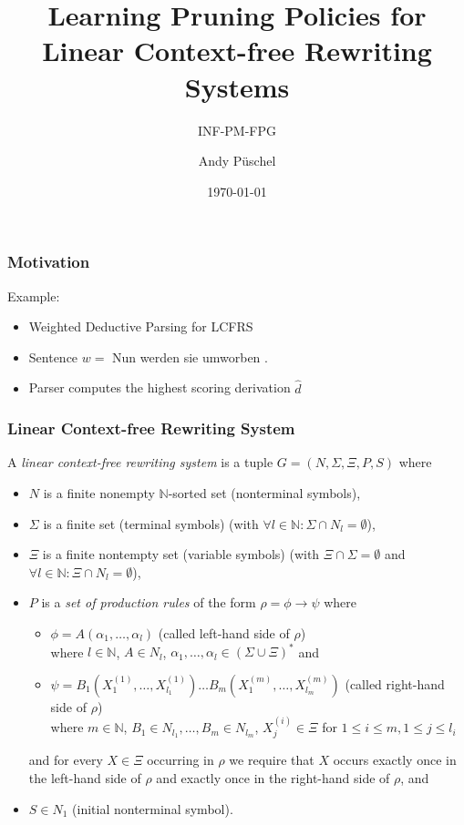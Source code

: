 \documentclass[ddcfooter, noheader, nototalpages, nosectionnum, svgnames]{tudbeamer}
\title{Learning Pruning Policies for Linear Context-free Rewriting Systems}
\subtitle{INF-PM-FPG}
\author{Andy Püschel}
\date{\today}
\begin{document}
\maketitle

\begin{frame}
	\frametitle{Motivation}
	Example:
	\begin{itemize}
		\item Weighted Deductive Parsing for LCFRS
		\item Sentence
			$w =$ Nun werden sie umworben .
		\item Parser computes the highest scoring derivation $\hat{d}$
	\end{itemize}
\end{frame}

\begin{frame}
	\frametitle{Linear Context-free Rewriting System}
	\begin{definition}
		A \emph{linear context-free rewriting system} is a tuple
		$G =(N, \Sigma, \Xi, P, S)$ where
		\begin{itemize}
			\item $N$ is a finite nonempty $\mathbb{N}$-sorted set (nonterminal symbols),
			\item $\Sigma$ is a finite set (terminal symbols)
				(with $\forall l \in \mathbb{N}: \Sigma \cap N_l = \emptyset$),
			\item $\Xi$ is a finite nontempty set (variable symbols)
				(with $\Xi \cap \Sigma = \emptyset$ and
				$\forall l \in \mathbb{N}: \Xi \cap N_l = \emptyset$),
			\item $P$ is a \emph{set of production rules}
				of the form $\rho = \phi \to \psi$ where
				\begin{itemize}
					\item $\phi = A(\alpha_1, \ldots, \alpha_l)$
						(called left-hand side of $\rho$)\\
						where $l \in \mathbb{N}$, $A \in N_l$,
						$\alpha_1, \ldots, \alpha_l \in (\Sigma \cup \Xi)^*$ and
					\item $\psi = B_1(X^{(1)}_1, \ldots, X^{(1)}_{l_1})
						\ldots B_m(X^{(m)}_1, \ldots, X^{(m)}_{l_m})$
						(called right-hand side of $\rho$)\\
						where $m \in \mathbb{N}$,
						$B_1 \in N_{l_1}, \ldots, B_m \in N_{l_m}$,
						$X^{(i)}_{j} \in \Xi$ for $1 \leq i \leq m, 1 \leq j \leq l_i$
				\end{itemize}
				and for every $X \in \Xi$ occurring in $\rho$ we require that $X$ occurs
				exactly once in the left-hand side of $\rho$ and
				exactly once in the right-hand side of $\rho$, and
			\item $S \in N_1$ (initial nonterminal symbol).
		\end{itemize}
	\end{definition}
\end{frame}
\end{document}
